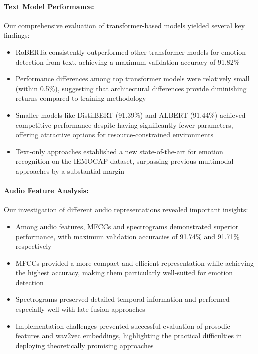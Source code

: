 \documentclass[12pt]{article}
\begin{document}
\paragraph{Text Model Performance:}
Our comprehensive evaluation of transformer-based models yielded several key findings:
\begin{itemize}
    \item RoBERTa consistently outperformed other transformer models for emotion detection from text, achieving a maximum validation accuracy of 91.82\%
    
    \item Performance differences among top transformer models were relatively small (within 0.5\%), suggesting that architectural differences provide diminishing returns compared to training methodology
    
    \item Smaller models like DistilBERT (91.39\%) and ALBERT (91.44\%) achieved competitive performance despite having significantly fewer parameters, offering attractive options for resource-constrained environments
    
    \item Text-only approaches established a new state-of-the-art for emotion recognition on the IEMOCAP dataset, surpassing previous multimodal approaches by a substantial margin
\end{itemize}

\paragraph{Audio Feature Analysis:}
Our investigation of different audio representations revealed important insights:
\begin{itemize}
    \item Among audio features, MFCCs and spectrograms demonstrated superior performance, with maximum validation accuracies of 91.74\% and 91.71\% respectively
    
    \item MFCCs provided a more compact and efficient representation while achieving the highest accuracy, making them particularly well-suited for emotion detection
    
    \item Spectrograms preserved detailed temporal information and performed especially well with late fusion approaches
    
    \item Implementation challenges prevented successful evaluation of prosodic features and wav2vec embeddings, highlighting the practical difficulties in deploying theoretically promising approaches
\end{itemize}
\end{document}
